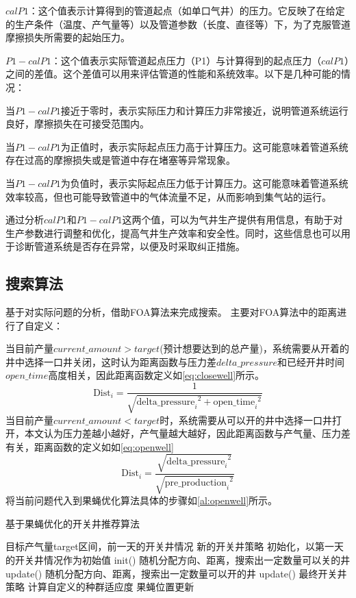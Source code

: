 $calP1$：这个值表示计算得到的管道起点（如单口气井）的压力。它反映了在给定的生产条件（温度、产气量等）以及管道参数（长度、直径等）下，为了克服管道摩擦损失所需要的起始压力。 

$P1 - calP1$：这个值表示实际管道起点压力（P1）与计算得到的起点压力（$calP1$）之间的差值。这个差值可以用来评估管道的性能和系统效率。以下是几种可能的情况：

当$P1 - calP1$接近于零时，表示实际压力和计算压力非常接近，说明管道系统运行良好，摩擦损失在可接受范围内。 

当$P1 - calP1$为正值时，表示实际起点压力高于计算压力。这可能意味着管道系统存在过高的摩擦损失或是管道中存在堵塞等异常现象。 

当$P1 - calP1$为负值时，表示实际起点压力低于计算压力。这可能意味着管道系统效率较高，但也可能导致管道中的气体流量不足，从而影响到集气站的运行。 

通过分析$calP1$和$P1 - calP1$这两个值，可以为气井生产提供有用信息，有助于对生产参数进行调整和优化，提高气井生产效率和安全性。同时，这些信息也可以用于诊断管道系统是否存在异常，以便及时采取纠正措施。
\subsection{搜索算法}
基于对实际问题的分析，借助FOA算法来完成搜索。
主要对FOA算法中的距离进行了自定义：

当目前产量$current\_amount>target$(预计想要达到的总产量)，系统需要从开着的井中选择一口井关闭，这时认为距离函数与压力差$delta\_pressure$和已经开井时间$open\_time$高度相关，因此距离函数定义如\eqref{eq:closewell}所示。
\begin{equation}
    \text{Dist}_i = \frac{1}{\sqrt{{\text{delta\_pressure}_i}^2 + {\text{open\_time}_i}^2}}
    \label{eq:closewell}
\end{equation}
当目前产量$current\_amount<target$时，系统需要从可以开的井中选择一口井打开，本文认为压力差越小越好，产气量越大越好，因此距离函数与产气量、压力差有关，距离函数的定义如如\eqref{eq:openwell}
\begin{equation}
    \text{Dist}_i = \frac{\sqrt{{\text{delta\_pressure}_i}^2}}{\sqrt{{\text{pre\_production}_i}^2}}
    \label{eq:openwell}
\end{equation}
将当前问题代入到果蝇优化算法具体的步骤如\ref{al:openwell}所示。
\begin{algorithm}[H]
    \caption{基于果蝇优化的开关井推荐算法}
    \begin{algorithmic}[1]
       \Require 目标产气量target区间，前一天的开关井情况
       \Ensure  新的开关井策略
       \State 初始化，以第一天的开关井情况作为初始值 init()
                \State 随机分配方向、距离，搜索出一定数量可以关的井 update()
                \State 随机分配方向、距离，搜索出一定数量可以开的井 update()
            \Else
                \State \Return 最终开关井策略
            \EndIf
            \State 计算自定义的种群适应度
            \State 果蝇位置更新
        \EndWhile
    \end{algorithmic}
    \label{al:openwell}
\end{algorithm}
